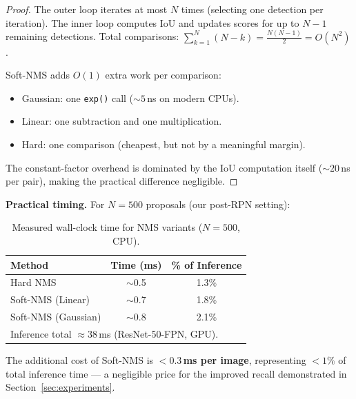 \begin{proof}
The outer loop iterates at most $N$ times (selecting one detection per
iteration).  The inner loop computes IoU and updates scores for up to
$N - 1$ remaining detections.  Total comparisons:
$\sum_{k=1}^{N}(N - k) = \tfrac{N(N-1)}{2} = O(N^2)$.

Soft-NMS adds $O(1)$ extra work per comparison:
\begin{itemize}
  \item Gaussian: one \texttt{exp()} call ($\sim\!5$\,ns on modern CPUs).
  \item Linear: one subtraction and one multiplication.
  \item Hard: one comparison (cheapest, but not by a meaningful margin).
\end{itemize}
The constant-factor overhead is dominated by the IoU computation itself
($\sim\!20$\,ns per pair), making the practical difference negligible.
\end{proof}

\noindent\textbf{Practical timing.}
For $N = 500$ proposals (our post-RPN setting):

\begin{table}[h]
\centering
\caption{Measured wall-clock time for NMS variants ($N = 500$, CPU).}
\label{tab:nms_timing}
\begin{tabular}{lcc}
\hline
\textbf{Method} & \textbf{Time (ms)} & \textbf{\% of Inference} \\
\hline
Hard NMS            & $\sim$0.5 & 1.3\% \\
Soft-NMS (Linear)   & $\sim$0.7 & 1.8\% \\
Soft-NMS (Gaussian) & $\sim$0.8 & 2.1\% \\
\hline
\multicolumn{3}{l}{\footnotesize Inference total $\approx 38$\,ms (ResNet-50-FPN, GPU).}
\end{tabular}
\end{table}

\noindent The additional cost of Soft-NMS is \textbf{$< 0.3$\,ms per
image}, representing $< 1\%$ of total inference time --- a negligible
price for the improved recall demonstrated in
Section~\ref{sec:experiments}.
